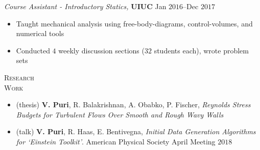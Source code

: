 \documentclass[10pt]{article}
\begin{document}
\begin{multicols}{2}
\vspace{0.5em}
%
{\sl Course Assistant - Introductory Statics,} \textbf{UIUC} \hfill Jan $2016$--Dec $2017$

\vspace{-1.75em}
\begin{itemize}[label=-]
    \setlength\itemsep{-0.25em}
    \item Taught mechanical analysis using free-body-diagrams, control-volumes, and numerical tools
    \item Conducted $4$ weekly discussion sections ($32$ students each), wrote problem sets
\end{itemize}
\vspace{-2.0em}

\end{multicols}
\vspace{-1.5em}
\begin{multicols}{2}
\textsc{\small Research \\ Work}
\columnbreak

\vspace{-1.75em}
\begin{itemize}[label= ]
    \setlength{\itemindent}{-2.5em}
    \setlength\itemsep{-1.0\itemsep}
    \item (thesis) \textbf{V. Puri}, R. Balakrishnan, A. Obabko, P. Fischer, {\sl Reynolds Stress Budgets for Turbulent Flows Over Smooth and Rough Wavy Walls}
    \item (talk) \textbf{V. Puri}, R. Haas, E. Bentivegna, {\sl Initial Data Generation Algorithms for `Einstein Toolkit'}. American Physical Society April Meeting $2018$
\end{itemize}
\vspace{-2.0em}

\end{multicols}
\vspace{-1.5em}
\end{document}
